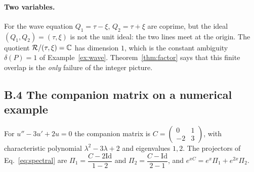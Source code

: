 \documentclass[11pt,a4paper]{article}
\theoremstyle{definition}
\newcommand{\ring}{\mathcal{R}}
\newcommand{\Id}{\mathrm{Id}}
\begin{document}
\paragraph{Two variables.} For the wave equation $Q_1=\tau-\xi$, $Q_2=\tau+\xi$ are coprime, but the ideal $(Q_1,Q_2)=(\tau,\xi)$ is not the unit ideal: the two lines meet at the origin. The quotient $\ring/(\tau,\xi)=\C$ has dimension $1$, which is the constant ambiguity $\delta(P)=1$ of Example~\ref{ex:wave}. Theorem~\ref{thm:factor} says that this finite overlap is the \emph{only} failure of the integer picture.

\subsection*{B.4 The companion matrix on a numerical example}
For $u''-3u'+2u=0$ the companion matrix is $C=\begin{pmatrix}0&1\\-2&3\end{pmatrix}$, with characteristic polynomial $\lambda^2-3\lambda+2$ and eigenvalues $1,2$. The projectors of Eq.~\eqref{eq:spectral} are $\Pi_1=\dfrac{C-2\Id}{1-2}$ and $\Pi_2=\dfrac{C-\Id}{2-1}$, and $e^{xC}=e^x\Pi_1+e^{2x}\Pi_2$.
\end{document}
